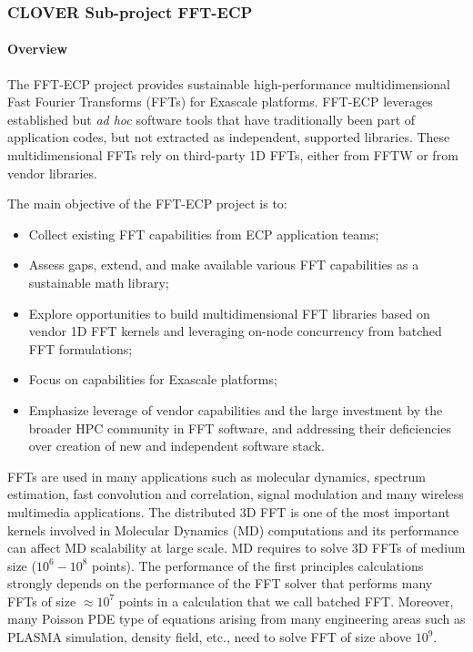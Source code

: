 \subsubsection{CLOVER Sub-project FFT-ECP}\label{subsubsect:fftecp}


\paragraph{Overview}

The FFT-ECP project provides sustainable high-performance multidimensional
Fast Fourier Transforms (FFTs) for Exascale platforms. 
FFT-ECP leverages established but {\it ad hoc} 
software tools that have traditionally been part of application 
codes, but not extracted as independent, supported libraries. 
These multidimensional FFTs rely on third-party 1D FFTs, either from FFTW or 
from vendor libraries.

The main objective of the FFT-ECP project is to:
\begin{itemize}
\item Collect existing FFT capabilities from ECP 
      application teams;
\item Assess gaps, extend, and make available various FFT
      capabilities as a sustainable math library;
\item Explore opportunities to build multidimensional FFT libraries based 
      on vendor 1D FFT kernels and leveraging on-node concurrency from 
      batched FFT formulations;
\item Focus on capabilities for Exascale platforms;
\item Emphasize leverage of vendor capabilities 
      and the large investment by the broader HPC community in FFT
      software, and addressing their 
      deficiencies over creation of new and independent software stack.
\end{itemize}

FFTs are used in many applications such as molecular dynamics, 
spectrum estimation, fast convolution and correlation, signal 
modulation and many wireless multimedia applications. The 
distributed 3D FFT is one of the most important kernels involved 
in Molecular Dynamics (MD) computations and its performance can 
affect MD scalability at large scale. MD requires to solve 3D FFTs 
of medium size ($10^6-10^8$ points). The performance of the first 
principles calculations strongly depends on the performance of the 
FFT solver that performs many FFTs of size $\approx 10^7$ points in 
a calculation that we call batched FFT. Moreover, many Poisson PDE 
type of equations arising from many engineering areas such as PLASMA 
simulation, density field, etc., need to solve FFT of size above $10^9$. 

